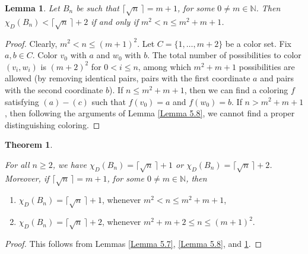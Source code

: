 \documentclass[12pt,reqno,a4paper]{amsart}
\theoremstyle{definition}
\newtheorem{thm}[defn]{Theorem}
\newtheorem{lem}[defn]{Lemma}
\begin{document}
\begin{lem}\label{Lemma 5.9}
   {\em Let $B_n$ be such that $\lceil \sqrt{n}\,\rceil = m+1$, for some $0\neq m\in \mathbb{N}$. Then $\chi_{D}(B_n) < \lceil \sqrt{n}\,\rceil + 2$ if and only if $m^2 < n \leq m^2 + m+1$.}
\end{lem}
\begin{proof}
    Clearly, $m^2<n\leq (m+1)^2$. Let $C = \{1,\dots, m+2\}$ be a color set. Fix $a,b\in C$. Color $v_0$ with $a$ and $w_0$ with $b$. The total number of possibilities to color $(v_i,w_i)$ is $(m+2)^2$ for $0<i\leq n$, among which $m^2 + m + 1$ possibilities are allowed (by removing identical pairs, pairs with the first coordinate $a$ and pairs with the second coordinate $b$). If $n\leq m^2 + m + 1$, then we can find a coloring $f$ satisfying $(a)-(c)$ such that $f(v_0) = a$ and $f(w_0) = b$. If $n> m^2 + m + 1$, then following the arguments of Lemma \ref{Lemma 5.8}, we cannot find a proper distinguishing coloring.
\end{proof}

\begin{thm}\label{Theorem 5.10}
    {\em For all $n\geq 2$, we have $\chi_D(B_n) = \lceil \sqrt{n}\,\rceil + 1$ or $\chi_D(B_n) = \lceil \sqrt{n}\,\rceil + 2$. Moreover, if $\lceil \sqrt{n}\,\rceil = m+1$, for some $0\neq m\in \mathbb{N}$, then
    \begin{enumerate}
        \item[(i)] $\chi_D(B_n) = \lceil \sqrt{n}\,\rceil + 1$, whenever $m^2 < n\leq m^2 + m + 1$,
        \item[(ii)]  $\chi_D(B_n) = \lceil \sqrt{n}\,\rceil + 2$, whenever $m^2 +m + 2\leq n \leq (m+1)^2$.
    \end{enumerate}}
\end{thm}
\begin{proof}
     This follows from Lemmas \ref{Lemma 5.7}, \ref{Lemma 5.8}, and \ref{Lemma 5.9}.
\end{proof}
\end{document}
